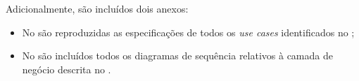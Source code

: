 Adicionalmente, são incluídos dois anexos:

\begin{itemize}

  \item No  são reproduzidas as especificações de todos os \emph{use cases} identificados no ;



  \item No  são incluídos todos os diagramas de sequência relativos à camada de negócio descrita no .

\end{itemize}
  
